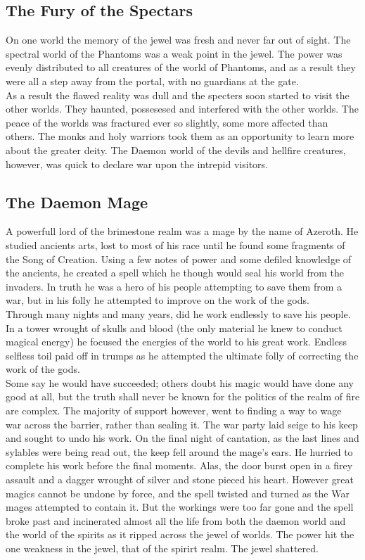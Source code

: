 \documentclass[a4paper]{article}
\begin{document}
\subsection{The Fury of the Spectars}

On one world the memory of the jewel was fresh and never far out of sight. The spectral world of the Phantoms was a weak point in the jewel. The power was evenly distributed to all creatures of the world of Phantoms, and as a result they were all a step away from the portal, with no guardians at the gate.\\
As a result the flawed reality was dull and the specters soon started to visit the other worlds. They haunted, possesesed and interfered with the other worlds. The peace of the worlds was fractured ever so slightly, some more affected than others. The monks and holy warriors took them as an opportunity to learn more about the greater deity. The Daemon world of the devils and hellfire creatures, however, was quick to declare war upon the intrepid visitors.

\subsection{The Daemon Mage}

A powerfull lord of the brimestone realm was a mage by the name of Azeroth. He studied ancients arts, lost to most of his race until he found some fragments of the Song of Creation. Using a few notes of power and some defiled knowledge of the ancients, he created a spell which he though would seal his world from the invaders. In truth he was a hero of his people attempting to save them from a war, but in his folly he attempted to improve on the work of the gods.\\
Through many nights and many years, did he work endlessly to save his people. In a tower wrought of skulls and blood (the only material he knew to conduct magical energy) he focused the energies of the world to his great work. Endless selfless toil paid off in trumps as he attempted the ultimate folly of correcting the work of the gods.\\
Some say he would have succeeded; others doubt his magic would have done any good at all, but the truth shall never be known for the politics of the realm of fire are complex. The majority of support however, went to finding a way to wage war across the barrier, rather than sealing it. The war party laid seige to his keep and sought to undo his work. On the final night of cantation, as the last lines and sylables were being read out, the keep fell around the mage's ears. He hurried to complete his work before the final moments. Alas, the door burst open in a firey assault and a dagger wrought of silver and stone pieced his heart. However great magics cannot be undone by force, and the spell twisted and turned as the War mages attempted to contain it. But the workings were too far gone and the spell broke past and incinerated almost all the life from both the daemon world and the world of the spirits as it ripped across the jewel of worlds. The power hit the one weakness in the jewel, that of the spirirt realm. The jewel shattered.
\end{document}
